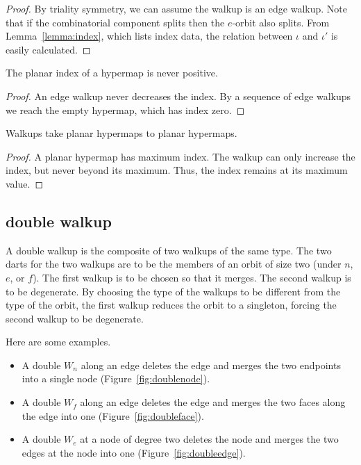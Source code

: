 \begin{proof}  By triality symmetry, 
we can assume the walkup is an edge walkup.  
Note that
if the combinatorial component splits then
the $e$-orbit also splits.
From Lemma~\ref{lemma:index},
which lists index data, the
relation between $\iota$ and $\iota'$ is easily calculated.
\end{proof}


\begin{lemma}  
The planar index
of a hypermap is never positive.
\end{lemma}

\begin{proof}  An edge walkup never decreases the index.  By a sequence
of edge walkups we reach the empty hypermap, which has
index zero.
\end{proof}


\begin{lemma}
Walkups take planar hypermaps to planar
hypermaps.
\end{lemma}

\begin{proof}  
A planar hypermap has maximum index.  The walkup
can only increase the index, but never beyond its maximum.  
Thus, the index remains at its maximum value.
\end{proof}


\subsection{double walkup}

A double walkup is the composite of two walkups
of the same type.  The
two darts for the two walkups 
are to be the members of an orbit of size
two (under $n$, $e$, or $f$).  The first walkup is to be
chosen so that it merges.  The second walkup is
to be degenerate.
By choosing the type of the walkups to be different from the type of
the orbit, the first walkup reduces the orbit to a singleton,
forcing the second walkup to be degenerate. 
 
Here are some examples.
\begin{itemize}
    \item A double $W_n$ along an edge deletes the edge and 
   merges the two endpoints into
    a single node (Figure~\ref{fig:doublenode}). 
    \item A double $W_f$ along an edge 
    deletes the edge and merges the two faces along the edge into
    one (Figure~\ref{fig:doubleface}).
    \item A double $W_e$ at a node of degree two
    deletes the node and merges the two edges at the node into
    one (Figure~\ref{fig:doubleedge}).
\end{itemize}


